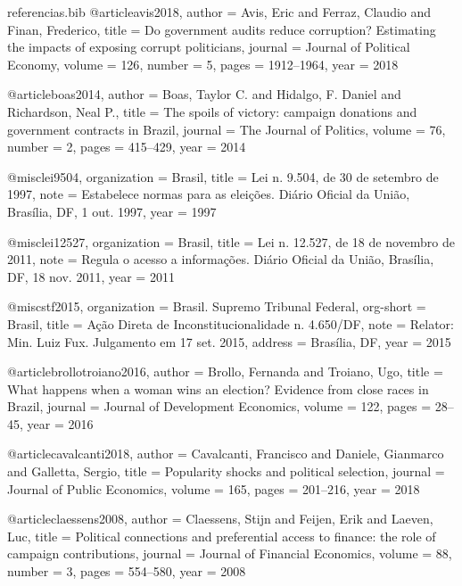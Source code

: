 \begin{filecontents*}[overwrite]{referencias.bib}
@article{avis2018,
  author  = {Avis, Eric and Ferraz, Claudio and Finan, Frederico},
  title   = {Do government audits reduce corruption? {E}stimating the impacts of exposing corrupt politicians},
  journal = {Journal of Political Economy},
  volume  = {126},
  number  = {5},
  pages   = {1912--1964},
  year    = {2018}
}

@article{boas2014,
  author  = {Boas, Taylor C. and Hidalgo, F. Daniel and Richardson, Neal P.},
  title   = {The spoils of victory: campaign donations and government contracts in {B}razil},
  journal = {The Journal of Politics},
  volume  = {76},
  number  = {2},
  pages   = {415--429},
  year    = {2014}
}

@misc{lei9504,
  organization = {Brasil},
  title        = {Lei n. 9.504, de 30 de setembro de 1997},
  note         = {Estabelece normas para as eleições. Diário Oficial da União, Brasília, DF, 1 out. 1997},
  year         = {1997}
}

@misc{lei12527,
  organization = {Brasil},
  title        = {Lei n. 12.527, de 18 de novembro de 2011},
  note         = {Regula o acesso a informações. Diário Oficial da União, Brasília, DF, 18 nov. 2011},
  year         = {2011}
}

@misc{stf2015,
  organization = {Brasil. Supremo Tribunal Federal},
  org-short    = {Brasil},
  title        = {Ação Direta de Inconstitucionalidade n. 4.650/DF},
  note         = {Relator: Min. Luiz Fux. Julgamento em 17 set. 2015},
  address      = {Brasília, DF},
  year         = {2015}
}

@article{brollotroiano2016,
  author  = {Brollo, Fernanda and Troiano, Ugo},
  title   = {What happens when a woman wins an election? {E}vidence from close races in {B}razil},
  journal = {Journal of Development Economics},
  volume  = {122},
  pages   = {28--45},
  year    = {2016}
}

@article{cavalcanti2018,
  author  = {Cavalcanti, Francisco and Daniele, Gianmarco and Galletta, Sergio},
  title   = {Popularity shocks and political selection},
  journal = {Journal of Public Economics},
  volume  = {165},
  pages   = {201--216},
  year    = {2018}
}

@article{claessens2008,
  author  = {Claessens, Stijn and Feijen, Erik and Laeven, Luc},
  title   = {Political connections and preferential access to finance: the role of campaign contributions},
  journal = {Journal of Financial Economics},
  volume  = {88},
  number  = {3},
  pages   = {554--580},
  year    = {2008}
}


\end{filecontents*}
